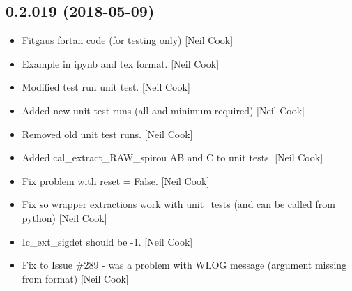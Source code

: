 \documentclass[a4paper,10pt,english]{report}
\begin{document}
\subsection{0.2.019 (2018-05-09)}
\label{\detokenize{misc/changelog:id439}}\begin{itemize}
\item {} 
Fitgaus fortan code (for testing only) {[}Neil Cook{]}

\item {} 
Example in ipynb and tex format. {[}Neil Cook{]}

\item {} 
Modified test run unit test. {[}Neil Cook{]}

\item {} 
Added new unit test runs (all and minimum required) {[}Neil Cook{]}

\item {} 
Removed old unit test runs. {[}Neil Cook{]}

\item {} 
Added cal\_extract\_RAW\_spirou AB and C to unit tests. {[}Neil Cook{]}

\item {} 
Fix problem with reset = False. {[}Neil Cook{]}

\item {} 
Fix so wrapper extractions work with unit\_tests (and can be called
from python) {[}Neil Cook{]}

\item {} 
Ic\_ext\_sigdet should be -1. {[}Neil Cook{]}

\item {} 
Fix to Issue \#289 - was a problem with WLOG message (argument missing
from format) {[}Neil Cook{]}

\end{itemize}
\end{document}
